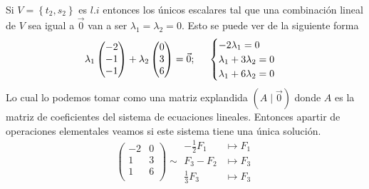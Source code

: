 \documentclass{article}
\begin{document}
\begin{enumerate}
\begin{itemize}
\begin{itemize}
\[                    \]
                    Si \(V = \left\{t_2, s_2\right\}\) es \(l.i\) entonces los únicos escalares tal que una combinación lineal de \(V\) sea igual a \(\vec{0}\) van a ser \(\lambda_1 = \lambda_2 = 0\).
                    Esto se puede ver de la siguiente forma 
                    \[
                        \lambda_1 
                        \begin{pmatrix}
                            -2 \\ -1 \\ -1
                        \end{pmatrix}
                        +
                        \lambda_2
                        \begin{pmatrix}
                            0 \\ 3 \\ 6
                        \end{pmatrix}
                        =
                        \vec{0};
                        \hspace{0.5cm}
                        \begin{cases}
                            -2\lambda_1  = 0 \\
                            \lambda_1 + 3\lambda_2 = 0 \\
                            \lambda_1 + 6\lambda_2 = 0
                        \end{cases}
                    \]
                    Lo cual lo podemos tomar como una matriz explandida \(\left(A\mid\vec{0}\right)\) donde \(A\) es la matriz de coeficientes del sistema de ecuaciones lineales. 
                    Entonces apartir de operaciones elementales veamos si este sistema tiene una única solución.
                    \[
                        \begin{pmatrix}
                            -2 & 0 \\
                            1 & 3 \\
                            1 & 6 \\
                        \end{pmatrix}
                        \sim
                        \begin{aligned}
                            -\frac{1}{2}F_1 &\mapsto F_1 \\
                            F_3 - F_2 &\mapsto F_3 \\
                            \frac{1}{3}F_3 &\mapsto F_3 
                        \end{aligned}
\]
\end{itemize}
\end{itemize}
\end{enumerate}
\end{document}
